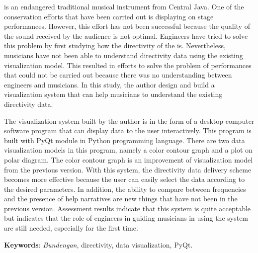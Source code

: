 \Bundengan is an endangered traditional musical instrument from Central Java. One of the conservation efforts that have been carried out is displaying \bundengan on stage performances. However, this effort has not been successful because the quality of the \bundengan sound received by the audience is not optimal. Engineers have tried to solve this problem by first studying how the directivity of the \bundengan is. Nevertheless, \bundengan musicians have not been able to understand directivity data using the existing visualization model. This resulted in efforts to solve the problem of \bundengan performances that could not be carried out because there was no understanding between engineers and \bundengan musicians. In this study, the author design and build a visualization system that can help \bundengan musicians to understand the existing directivity data. \par 

The visualization system built by the author is in the form of a desktop computer software program that can display data to the user interactively. This program is built with PyQt module in Python programming language. There are two data visualization models in this program, namely a color contour graph and a plot on polar diagram. The color contour graph is an improvement of visualization model from the previous version. With this system, the directivity data delivery scheme becomes more effective because the user can easily select the data according to the desired parameters. In addition, the ability to compare between frequencies and the presence of help narratives are new things that have not been in the previous version. Assessment results indicate that this system is quite acceptable but indicates that the role of engineers in guiding musicians in using the system are still needed, especially for the first time. \par 

\vspace{0.5cm}
\hspace{-1.2cm}
\textbf{Keywords}: \textit{Bundengan}, directivity, data visualization, PyQt.

